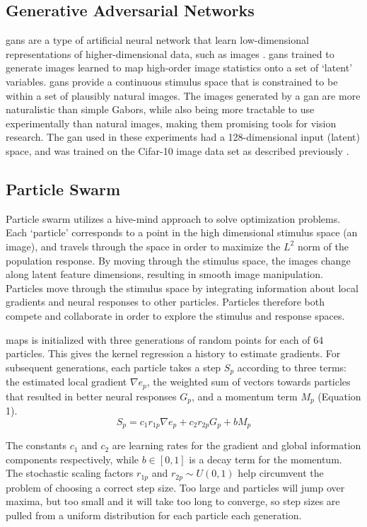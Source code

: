 \subsection{Generative Adversarial Networks}
\Glspl{gan} are a type of artificial neural network that learn low-dimensional representations of higher-dimensional data, such as images \cite{Karras2019}. \glspl{gan} trained to generate images learned to map high-order image statistics onto a set of `latent' variables.  \glspl{gan} provide a continuous stimulus space that is constrained to be within a set of plausibly natural images. The images generated by a \gls{gan} are more naturalistic than simple Gabors, while also being more tractable to use experimentally than natural images, making them promising tools for vision research. The \gls{gan} used in these experiments had a 128-dimensional input (latent) space, and was trained on the Cifar-10 image data set as described previously \cite{Fruend2018}. 

\subsection{Particle Swarm}
Particle swarm utilizes a hive-mind approach to solve optimization problems. Each `particle’ corresponds to a point in the high dimensional stimulus space (an image), and travels through the space in order to maximize the $L^2$ norm of the population response. By moving through the stimulus space, the images change along latent feature dimensions, resulting in smooth image manipulation. Particles move through the stimulus space by integrating information about local gradients and neural responses to other particles. Particles therefore both compete and collaborate in order to explore the stimulus and response spaces. 

\gls{maps} is initialized with three generations of random points for each of 64 particles. This gives the kernel regression a history to estimate gradients. For subsequent generations, each particle takes a step $S_p$ according to three terms: the estimated local gradient $\nabla e_p$,  the weighted sum of vectors towards particles that resulted in better neural responses $G_p$, and a momentum term $M_p$ (Equation 1).
\begin{equation}
S_p= c_1 r_{1p} \nabla e_p+ c_2  r_{2p} G_p+b M_p
\end{equation}

The constants $c_1$ and $c_2$ are learning rates for the gradient and global information components respectively, while $b \in [0,1]$ is a decay term for the momentum. The stochastic scaling factors $r_{1p}$ and $r_{2p} \sim U(0,1)$ help circumvent the problem of choosing a correct step size. Too large and particles will jump over maxima, but too small and it will take too long to converge, so step sizes are pulled from a uniform distribution for each particle each generation.

